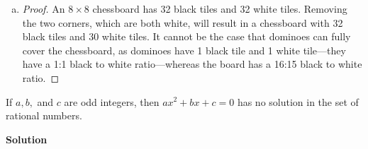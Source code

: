 \documentclass[11pt]{scrartcl}
\theoremstyle{dotlessP}
\theoremstyle{dotlessN}
\begin{document}
\begin{enumerate}[a)]
\begin{proof}
			As we have shown that $x$ is odd $\to$ $x^3$ is odd and that $x^3$ is odd $\to$ $x$ is odd, the biconditional statement that, if $x$ is an integer, then $x$ is odd if and only if $x^3$ is odd is true.
		\end{proof}
	\item 
		\begin{proof}
			An $8 \times 8$ chessboard has 32 black tiles and 32 white tiles. Removing the two corners, which are both white, will result in a chessboard with 32 black tiles and 30 white tiles. It cannot be the case that dominoes can fully cover the chessboard, as dominoes have 1 black tile and 1 white tile---they have a 1:1 black to white ratio---whereas the board has a 16:15 black to white ratio.
		\end{proof}
\end{enumerate}
\begin{ques}
	If $a,b,$ and $c$ are odd integers, then $ax^2 + bx + c = 0$ has no solution in the set of rational numbers.
\end{ques}
\textbf{Solution}
\end{document}

